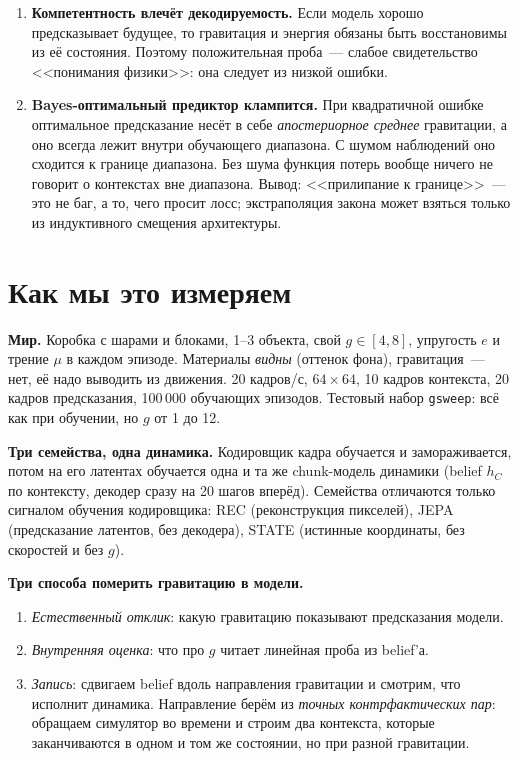 \documentclass[11pt]{article}
\begin{document}
\begin{enumerate}
\item \textbf{Компетентность влечёт декодируемость.} Если модель хорошо предсказывает будущее, то
гравитация и энергия обязаны быть восстановимы из её состояния. Поэтому положительная проба~---
слабое свидетельство <<понимания физики>>: она следует из низкой ошибки.
\item \textbf{Bayes-оптимальный предиктор клампится.} При квадратичной ошибке оптимальное
предсказание несёт в себе \emph{апостериорное среднее} гравитации, а оно всегда лежит внутри
обучающего диапазона. С шумом наблюдений оно сходится к границе диапазона. Без шума функция потерь
вообще ничего не говорит о контекстах вне диапазона. Вывод: <<прилипание к границе>>~--- это не
баг, а то, чего просит лосс; экстраполяция закона может взяться только из индуктивного смещения
архитектуры.
\end{enumerate}

\section{Как мы это измеряем}

\textbf{Мир.} Коробка с шарами и блоками, 1--3 объекта, свой $g\in[4,8]$, упругость $e$ и трение
$\mu$ в каждом эпизоде. Материалы \emph{видны} (оттенок фона), гравитация~--- нет, её надо выводить
из движения. 20 кадров/с, $64{\times}64$, 10 кадров контекста, 20 кадров предсказания, 100\,000
обучающих эпизодов. Тестовый набор \texttt{gsweep}: всё как при обучении, но $g$ от 1 до 12.

\textbf{Три семейства, одна динамика.} Кодировщик кадра обучается и замораживается, потом на его
латентах обучается одна и та же chunk-модель динамики (belief $h_C$ по контексту, декодер сразу на
20 шагов вперёд). Семейства отличаются только сигналом обучения кодировщика:
REC (реконструкция пикселей), JEPA (предсказание латентов, без декодера), STATE (истинные
координаты, без скоростей и без $g$).

\textbf{Три способа померить гравитацию в модели.}
\begin{enumerate}
\item \emph{Естественный отклик}: какую гравитацию показывают предсказания модели.
\item \emph{Внутренняя оценка}: что про $g$ читает линейная проба из belief'а.
\item \emph{Запись}: сдвигаем belief вдоль направления гравитации и смотрим, что исполнит
динамика. Направление берём из \emph{точных контрфактических пар}: обращаем симулятор во времени и
строим два контекста, которые заканчиваются в одном и том же состоянии, но при разной гравитации.
\end{enumerate}
\end{document}

